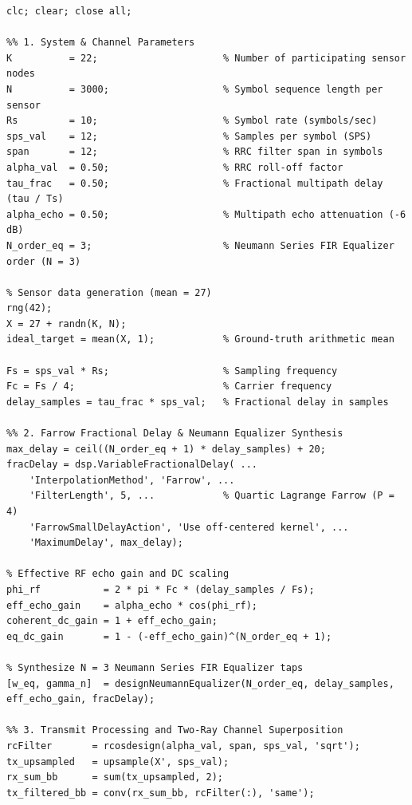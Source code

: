 \documentclass[Markos_Delaportas_1316.tex]{subfiles}
\begin{document}
    \begin{lstlisting}[style=Matlab-editor, caption={MATLAB implementation of Over-the-Air computation under two-ray multipath fading with Farrow ($P=4$) fractional delay and $N=3$ Neumann series equalization.}, label={lst:matlab_multipath_aircomp}]
% Over-the-Air Computation with Farrow (P=4) Multipath Delay & N=3 Neumann Equalizer
clc; clear; close all;

%% 1. System & Channel Parameters
K          = 22;                      % Number of participating sensor nodes
N          = 3000;                    % Symbol sequence length per sensor
Rs         = 10;                      % Symbol rate (symbols/sec)
sps_val    = 12;                      % Samples per symbol (SPS)
span       = 12;                      % RRC filter span in symbols
alpha_val  = 0.50;                    % RRC roll-off factor
tau_frac   = 0.50;                    % Fractional multipath delay (tau / Ts)
alpha_echo = 0.50;                    % Multipath echo attenuation (-6 dB)
N_order_eq = 3;                       % Neumann Series FIR Equalizer order (N = 3)

% Sensor data generation (mean = 27)
rng(42);
X = 27 + randn(K, N);
ideal_target = mean(X, 1);            % Ground-truth arithmetic mean

Fs = sps_val * Rs;                    % Sampling frequency
Fc = Fs / 4;                          % Carrier frequency
delay_samples = tau_frac * sps_val;   % Fractional delay in samples

%% 2. Farrow Fractional Delay & Neumann Equalizer Synthesis
max_delay = ceil((N_order_eq + 1) * delay_samples) + 20;
fracDelay = dsp.VariableFractionalDelay( ...
    'InterpolationMethod', 'Farrow', ...
    'FilterLength', 5, ...            % Quartic Lagrange Farrow (P = 4)
    'FarrowSmallDelayAction', 'Use off-centered kernel', ...
    'MaximumDelay', max_delay);

% Effective RF echo gain and DC scaling
phi_rf           = 2 * pi * Fc * (delay_samples / Fs);
eff_echo_gain    = alpha_echo * cos(phi_rf);
coherent_dc_gain = 1 + eff_echo_gain;
eq_dc_gain       = 1 - (-eff_echo_gain)^(N_order_eq + 1);

% Synthesize N = 3 Neumann Series FIR Equalizer taps
[w_eq, gamma_n]  = designNeumannEqualizer(N_order_eq, delay_samples, eff_echo_gain, fracDelay);

%% 3. Transmit Processing and Two-Ray Channel Superposition
rcFilter       = rcosdesign(alpha_val, span, sps_val, 'sqrt');
tx_upsampled   = upsample(X', sps_val);
rx_sum_bb      = sum(tx_upsampled, 2);
tx_filtered_bb = conv(rx_sum_bb, rcFilter(:), 'same');


\end{lstlisting}
\end{document}
